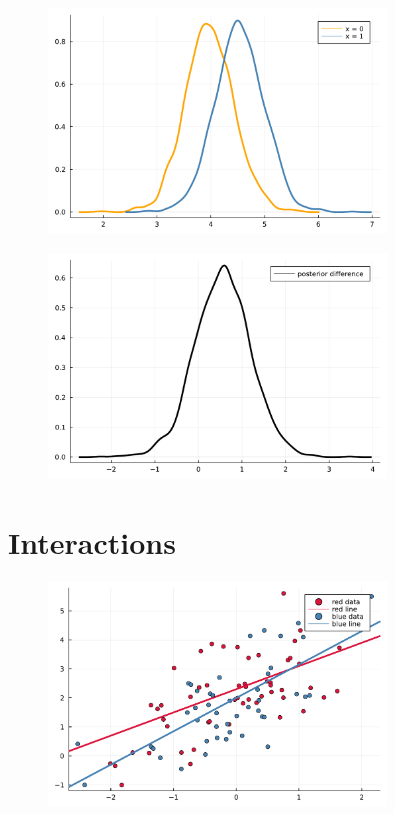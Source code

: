 \documentclass[aspectratio=169,xcolor=svgnames]{beamer}
\begin{document}
\begin{frame}
\begin{figure}[ht]
  \centering
  \includegraphics[width=0.8\textwidth]{figures/prediction_distrubtions.pdf}
\end{figure}
\end{frame}

\begin{frame}
\begin{figure}[ht]
  \centering
  \includegraphics[width=0.8\textwidth]{figures/prediction_difference.pdf}
\end{figure}
\end{frame}

\section{Interactions}

\begin{frame}
  \begin{figure}[ht]
    \centering
    \includegraphics[width=0.8\textwidth]{figures/plot_interaction.pdf}
  \end{figure}
\end{frame}
\end{document}
